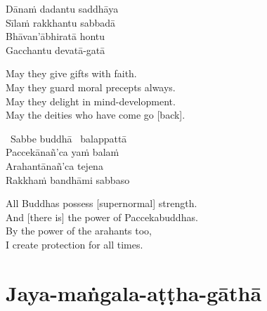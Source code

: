 \begin{pali-hang-continued}
  Dānaṁ dadantu saddhāya\\
  Sīlaṁ rakkhantu sabbadā\\
  Bhāvan'ābhiratā hontu\\
  Gacchantu devatā-gatā
\end{pali-hang-continued}

\begin{english-verses}
  May they give gifts with faith.\\
  May they guard moral precepts always.\\
  May they delight in mind-development.\\
  May the deities who have come go [back].
\end{english-verses}

\begin{leader-only}
\end{leader-only}

\vspace{-0.99em}

\begin{pali-hang-continued}
  \anglebracketleft\ \hspace{-0.5mm}Sabbe buddhā \hspace{-0.5mm}\anglebracketright\ balappattā\\
  Paccekānañ'ca yaṁ balaṁ\\
  Arahantānañ'ca tejena\\
  Rakkhaṁ bandhāmi sabbaso
\end{pali-hang-continued}

\begin{english-verses}
  All Buddhas possess [supernormal] strength.\\
  And [there is] the power of Paccekabuddhas.\\
  By the power of the arahants too,\\
  I create protection for all times.
\end{english-verses}

\suttaRef{[MJG]}



\section{Jaya-maṅgala-aṭṭha-gāthā}
\label{jaya-mangala-attha-gatha}


